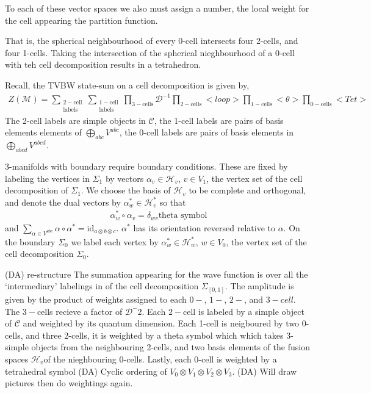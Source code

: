 \documentclass[12pt,a4paper]{article}
\newcommand{\tp}{\otimes}
\newcommand{\mcd}{\mathcal{D}}
\newcommand{\mch}{\mathcal{H}}
\newcommand{\mcc}{\mathcal{C}}
\newcommand{\mcm}{\mathcal{M}}
\newcommand{\dave}[1]{{\color{ao(english)}\footnotesize{(DA) #1}}}
\begin{document}
To each of these vector spaces we also must assign a number, the local weight for the cell appearing the partition function. 


That is, the spherical neighbourhood of every 0-cell intersects four 2-cells, and four 1-cells. 
Taking the intersection of the spherical nieghbourhood of a 0-cell with teh cell decomposition results in a tetrahedron. 


Recall, the TVBW state-sum on a cell decomposition is given by,
\begin{align}
Z(\mcm) = \sum_{\substack{2-\text{cell} \\ \text{labels}}} \sum_{\substack{1-\text{cell} \\ \text{labels}}}
\prod_{3-\text{cells}} \mcd^{-1} \prod_{2-\text{cells}} <loop> \prod_{1-\text{cells}} <\theta> \prod_{0-\text{cells}} <Tet>
\end{align}
The 2-cell labels are simple objects in $\mcc$, the 1-cell labels are pairs of basis elements elements of $\bigoplus_{abc} V^{abc}$, the 0-cell labels are pairs of basis elements in $\bigoplus_{abcd} V^{abcd}$. 

3-manifolds with boundary require boundary conditions. 
These are fixed by labeling the vertices in $\Sigma_1$ by vectors $\alpha_v \in \mch_v$, 
$v \in V_1$, the vertex set of the cell decomposition of $\Sigma_1$. 
We choose the basis of $\mch_v$ to be complete and orthogonal, and denote the dual vectors by $\alpha_w^*  \in \mch_v^*$ so that 
\begin{align}
\alpha_w^* \circ \alpha_v = \delta_{wv} \text{theta symbol} 
\end{align}
and $\sum_{\alpha \in V^{abc} }  \alpha \circ \alpha^* = \text{id}_{a \tp b \tp c}$.
$\alpha^*$ has its orientation reversed relative to $\alpha$.
On the boundary $\Sigma_0$ we label each vertex by $\alpha_w^* \in \mch_w^*$, 
$w \in V_0$, the vertex set of the cell decomposition $\Sigma_0$.

\dave{re-structure}
The summation appearing for the wave function is over all the `intermediary' labelings in of the cell decomposition $\Sigma_{[0,1]}$.
The amplitude is given by the product of weights assigned to each $0-$, $1-$, $2-$, and $3-cell$. 
The $3-$cells recieve a factor of $\mcd^-{2}$. 
Each $2-$cell is labeled by a simple object of $\mcc$ and weighted by its quantum dimension. 
Each 1-cell is neigboured by two 0-cells, and three 2-cells, 
it is weighted by a theta symbol which which takes 3-simple objects from the neighbouring 2-cells, 
and two basis elements of the fusion spaces $\mch_v$of the nieghbouring 0-cells.
Lastly, each $0$-cell is weighted by a tetrahedral symbol 
\dave{Cyclic ordering of $V_0 \tp V_1 \tp V_2 \tp V_3$.}
\dave{Will draw pictures then do weightings again.}
\end{document}
